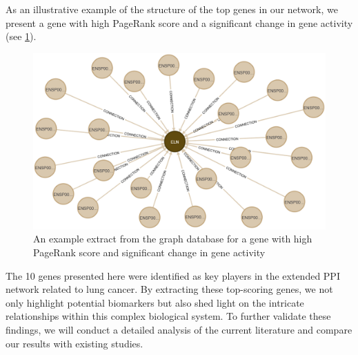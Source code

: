 As an illustrative example of the structure of the top genes in our network,
we present a gene with high PageRank score and a significant change in gene activity
(see \cref{fig:04_example_gene}).\\

\begin{figure}[h]
    \centering
    \includegraphics[height=\dfheightdouble]{figures/04_example_gene}
    \caption{An example extract from the graph database for a gene with high PageRank score and significant change in gene activity}
    \label{fig:04_example_gene}
\end{figure}

The 10 genes presented here were identified as key players in the extended PPI network related to lung cancer.
By extracting these top-scoring genes, we not only highlight potential biomarkers but also
shed light on the intricate relationships within this complex biological system.
To further validate these findings, we will conduct a detailed analysis of the current literature and compare our results with existing studies.
